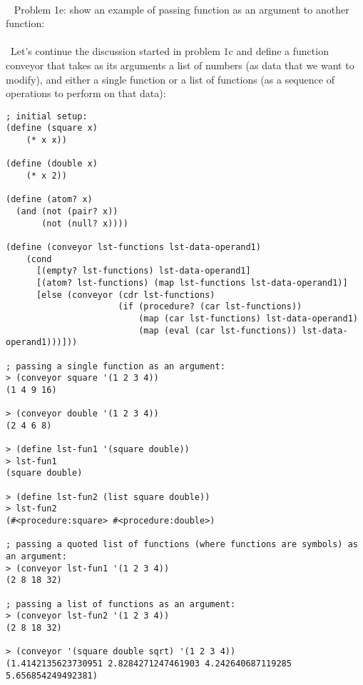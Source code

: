 \documentclass{article}
\begin{document}
\paragraph{}\
\rmfamily
Problem 1e: show an example of passing function as an argument to another function:
\paragraph{}\
Let's continue the discussion started in problem 1c and define a function conveyor that takes as its arguments a list of numbers (as data that we want to modify), and either a single function or a list of functions (as a sequence of operations to perform on that data):
\begin{verbatim} 
; initial setup:
(define (square x)
    (* x x))

(define (double x)
    (* x 2))
    
(define (atom? x)
  (and (not (pair? x))
       (not (null? x))))    
    
(define (conveyor lst-functions lst-data-operand1)
    (cond
      [(empty? lst-functions) lst-data-operand1]
      [(atom? lst-functions) (map lst-functions lst-data-operand1)]
      [else (conveyor (cdr lst-functions)
                      (if (procedure? (car lst-functions))
                          (map (car lst-functions) lst-data-operand1)
                          (map (eval (car lst-functions)) lst-data-operand1)))]))

; passing a single function as an argument:                          
> (conveyor square '(1 2 3 4))
(1 4 9 16)

> (conveyor double '(1 2 3 4))
(2 4 6 8)

> (define lst-fun1 '(square double))
> lst-fun1
(square double)

> (define lst-fun2 (list square double))
> lst-fun2
(#<procedure:square> #<procedure:double>)

; passing a quoted list of functions (where functions are symbols) as an argument:
> (conveyor lst-fun1 '(1 2 3 4))
(2 8 18 32)

; passing a list of functions as an argument:
> (conveyor lst-fun2 '(1 2 3 4))
(2 8 18 32)

> (conveyor '(square double sqrt) '(1 2 3 4))
(1.4142135623730951 2.8284271247461903 4.242640687119285 5.656854249492381)
\end{verbatim}

\paragraph{}\
\end{document}
